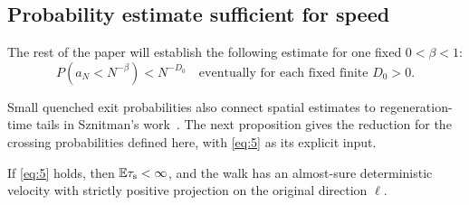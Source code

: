 \subsection{Probability estimate sufficient for speed}

The rest of the paper will establish the following estimate for one
fixed \(0<\beta<1\):
\[
P(a_N<N^{-\beta})<N^{-D_0}
\quad\text{eventually for each fixed finite }D_0>0.
\tag{5}\label{eq:5}
\]

Small quenched exit probabilities also connect spatial estimates to
regeneration-time tails in Sznitman's
work~\cite[Lemma~3.2 and Theorem~3.3]{Sznitman2002}.
The next proposition gives the reduction for the crossing probabilities
defined here, with \eqref{eq:5} as its explicit input.

\begin{proposition}\label{geom-speed}
If \eqref{eq:5} holds, then \(\mathbb E\tau_{\rm s}<\infty\), and
the walk has an almost-sure deterministic velocity with strictly positive
projection on the original direction \(\ell\).
\end{proposition}

